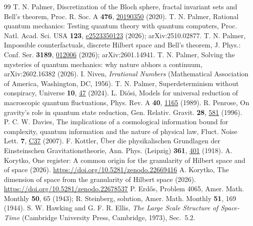 \documentclass[aps,prd,twocolumn,superscriptaddress,nofootinbib,showkeys]{revtex4-2}
\begin{document}
\begin{thebibliography}{99}
 T. N. Palmer, Discretization of the Bloch sphere, fractal invariant sets and Bell's theorem, Proc. R. Soc. A \textbf{476}, \href{https://doi.org/10.1098/rspa.2019.0350}{20190350} (2020).
 T. N. Palmer, Rational quantum mechanics: Testing quantum theory with quantum computers, Proc. Natl. Acad. Sci. USA \textbf{123}, \href{https://doi.org/10.1073/pnas.2523350123}{e2523350123} (2026); arXiv:2510.02877.
 T. N. Palmer, Impossible counterfactuals, discrete Hilbert space and Bell's theorem, J. Phys.: Conf. Ser. \textbf{3189}, \href{https://doi.org/10.1088/1742-6596/3189/1/012006}{012006} (2026); arXiv:2601.14941.
 T. N. Palmer, Solving the mysteries of quantum mechanics: why nature abhors a continuum, arXiv:2602.16382 (2026).
 I. Niven, \emph{Irrational Numbers} (Mathematical Association of America, Washington, DC, 1956).
 T. N. Palmer, Superdeterminism without conspiracy, Universe \textbf{10}, \href{https://doi.org/10.3390/universe10010047}{47} (2024).
 L. Di\'osi, Models for universal reduction of macroscopic quantum fluctuations, Phys. Rev. A \textbf{40}, \href{https://doi.org/10.1103/PhysRevA.40.1165}{1165} (1989).
 R. Penrose, On gravity's role in quantum state reduction, Gen. Relativ. Gravit. \textbf{28}, \href{https://doi.org/10.1007/BF02105068}{581} (1996).
 P. C. W. Davies, The implications of a cosmological information bound for complexity, quantum information and the nature of physical law, Fluct. Noise Lett. \textbf{7}, \href{https://doi.org/10.1142/S0219477507004021}{C37} (2007).
 F. Kottler, \"Uber die physikalischen Grundlagen der Einsteinschen Gravitationstheorie, Ann. Phys. (Leipzig) \textbf{361}, \href{https://doi.org/10.1002/andp.19183611402}{401} (1918).
 A. Korytko, One register: A common origin for the granularity of Hilbert space and of space (2026). \url{https://doi.org/10.5281/zenodo.22669416}
 A. Korytko, The dimension of space from the granularity of Hilbert space (2026). \url{https://doi.org/10.5281/zenodo.22678537}
 P. Erd\H{o}s, Problem 4065, Amer. Math. Monthly \textbf{50}, 65 (1943); R. Steinberg, solution, Amer. Math. Monthly \textbf{51}, 169 (1944).
 S. W. Hawking and G. F. R. Ellis, \emph{The Large Scale Structure of Space-Time} (Cambridge University Press, Cambridge, 1973), Sec.~5.2.

\end{thebibliography}
\end{document}
